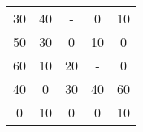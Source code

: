 \begin{tabular}{ccccc}
\rowcolor[rgb]{ .749,  .749,  .749} 30     & 40     & -      & \cellcolor[rgb]{ .929,  .49,  .192} 0 & 10 \\
\rowcolor[rgb]{ .749,  .749,  .749} 50     & 30     & \cellcolor[rgb]{ .929,  .49,  .192} 0 & 10     & 0 \\
60     & 10     & 20     & -      & \cellcolor[rgb]{ .929,  .49,  .192} 0 \\
\rowcolor[rgb]{ .749,  .749,  .749} 40     & \cellcolor[rgb]{ .929,  .49,  .192} 0 & 30     & 40     & 60 \\
\rowcolor[rgb]{ .929,  .49,  .192} 0      & \cellcolor[rgb]{ .749,  .749,  .749} 10 & \cellcolor[rgb]{ .749,  .749,  .749} 0 & \cellcolor[rgb]{ .749,  .749,  .749} 0 & \cellcolor[rgb]{ .749,  .749,  .749} 10 \bigstrut[b]\\
\hline
\hline
\end{tabular}%
